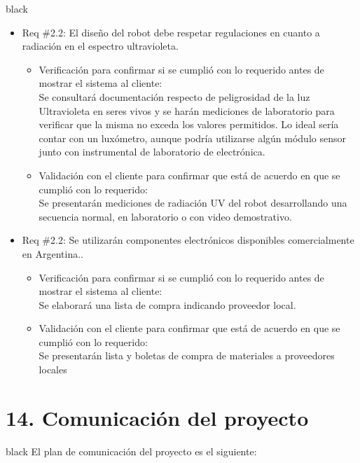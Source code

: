 \documentclass[11pt]{charter}
\begin{document}
\begin{consigna}{black}
\begin{itemize}
\item Req \#2.2: El diseño del robot debe respetar regulaciones en cuanto a radiación en el espectro ultravioleta.
\begin{itemize}
\item Verificación para confirmar si se cumplió con lo requerido antes de mostrar el
sistema al cliente:\\
Se consultará documentación respecto de peligrosidad de la luz Ultravioleta en seres vivos y se harán mediciones de laboratorio para verificar que la misma no exceda los valores permitidos. Lo ideal sería contar con un luxómetro, aunque podría utilizarse algún módulo sensor junto con instrumental de laboratorio de electrónica. \\
\item Validación con el cliente para confirmar que está de acuerdo en que se cumplió con lo requerido:\\ 
Se presentarán mediciones de radiación UV del robot desarrollando una secuencia normal, en laboratorio o con video demostrativo.\\
\end{itemize}

\item Req \#2.2: Se utilizarán componentes electrónicos disponibles comercialmente en Argentina..
\begin{itemize}
\item Verificación para confirmar si se cumplió con lo requerido antes de mostrar el
sistema al cliente:\\
Se elaborará una lista de compra indicando proveedor local. \\
\item Validación con el cliente para confirmar que está de acuerdo en que se cumplió con lo requerido:\\ 
Se presentarán lista y boletas de compra de materiales a proveedores locales \\
\end{itemize}

\end{itemize}

\end{consigna}
\pagebreak

\section{14. Comunicación del proyecto}
\label{sec:comunicaciones}

\begin{consigna}{black}
El plan de comunicación del proyecto es el siguiente:
\end{consigna}
\end{document}
